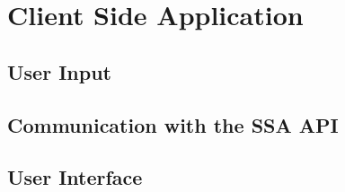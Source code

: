 \section{Client Side Application}
\label{sec:csa_implementation}




\subsection{User Input}
\label{sec:user_input}


\subsection{Communication with the SSA API}
\label{sec:api_communication}


\subsection{User Interface}
\label{sec:user_interface_ready}
